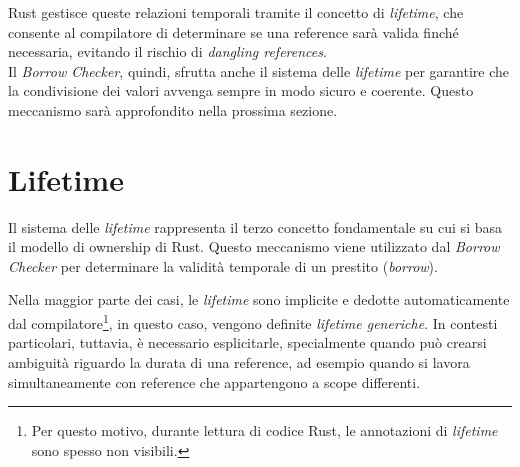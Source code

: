 Rust gestisce queste relazioni temporali tramite il concetto di \textit{lifetime}, che consente al compilatore di determinare se una reference sarà valida finché necessaria, evitando il rischio di \textit{dangling references}. \hfill
\vspace{10pt}\\
\noindent Il \textit{Borrow Checker}, quindi, sfrutta anche il sistema delle \textit{lifetime} per garantire che la condivisione dei valori avvenga sempre in modo sicuro e coerente. Questo meccanismo sarà approfondito nella prossima sezione.

\section{Lifetime}
Il sistema delle \textit{lifetime} rappresenta il terzo concetto fondamentale su cui si basa il modello di ownership di Rust. Questo meccanismo viene utilizzato dal \textit{Borrow Checker} per determinare la validità temporale di un prestito (\textit{borrow}).

Nella maggior parte dei casi, le \textit{lifetime} sono implicite e dedotte automaticamente dal compilatore\footnote{Per questo motivo, durante lettura di codice Rust, le annotazioni di \textit{lifetime} sono spesso non visibili.}, in questo caso, vengono definite \textit{lifetime generiche}. In contesti particolari, tuttavia, è necessario esplicitarle, specialmente quando può crearsi ambiguità riguardo la durata di una reference, ad esempio quando si lavora simultaneamente con reference che appartengono a scope differenti.

